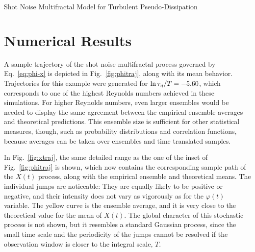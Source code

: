 \begin{chapter}{Shot Noise Multifractal Model for Turbulent Pseudo-Dissipation}

\section{Numerical Results} \label{sec:results}

A sample trajectory of the shot noise multifractal process governed by Eq.~\eqref{eq:phi-x}
is depicted in Fig.~\ref{fig:phitraj}, along with its mean behavior.
Trajectories for this example were generated for $\ln\tau_{\eta}/T = -5.60$, which corresponds to one of the highest Reynolds numbers achieved in these simulations.
For higher Reynolds numbers, even larger ensembles would be needed to display the same agreement between the empirical ensemble averages and theoretical predictions.
This ensemble size is sufficient for other statistical measures, though, such as probability distributions and correlation functions, because averages can be taken over ensembles and time translated samples.

In Fig.~\ref{fig:xtraj}, the same detailed range as the one of the inset of Fig.~\ref{fig:phitraj} is shown, which now contains the corresponding sample path of the $X(t)$ process, along with the empirical ensemble and theoretical means. The individual jumps are noticeable: They are equally likely to be positive or negative, and their intensity does not vary as vigorously as for the $\varphi(t)$ variable. The yellow curve is the ensemble average, and it is very close to the theoretical value for the mean of $X(t)$. The global character of this stochastic process is not shown, but it resembles a standard Gaussian process, since the small time scale and the periodicity of the jumps cannot be resolved if the observation window is closer to the integral scale, $T$.


\end{chapter}
